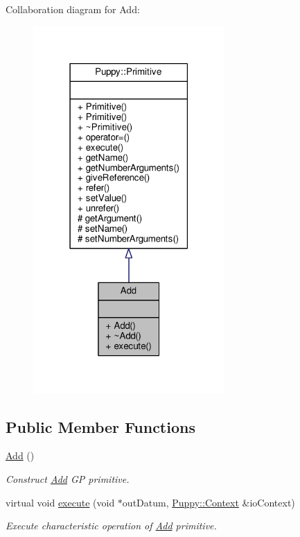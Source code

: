 Collaboration diagram for Add\+:
\nopagebreak
\begin{figure}[H]
\begin{center}
\leavevmode
\includegraphics[width=207pt]{classAdd__coll__graph}
\end{center}
\end{figure}
\subsection*{Public Member Functions}
\begin{DoxyCompactItemize}
\item 
\hypertarget{classAdd_a44b62ab4a0b9a4fb3e77427d35e411b9}{}\hyperlink{classAdd_a44b62ab4a0b9a4fb3e77427d35e411b9}{Add} ()\label{classAdd_a44b62ab4a0b9a4fb3e77427d35e411b9}

\begin{DoxyCompactList}\small\item\em Construct \hyperlink{classAdd}{Add} G\+P primitive. \end{DoxyCompactList}\item 
virtual void \hyperlink{classAdd_a5f17154064fd521553352f114db35018}{execute} (void $\ast$out\+Datum, \hyperlink{classPuppy_1_1Context}{Puppy\+::\+Context} \&io\+Context)
\begin{DoxyCompactList}\small\item\em Execute characteristic operation of \hyperlink{classAdd}{Add} primitive. \end{DoxyCompactList}\end{DoxyCompactItemize}
